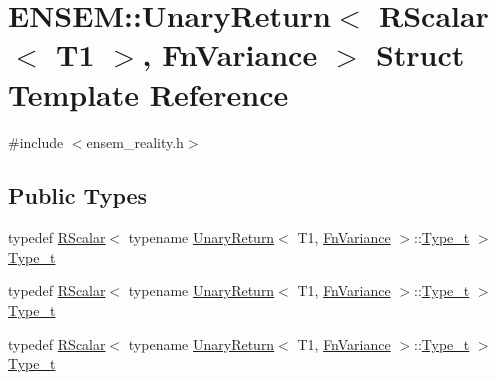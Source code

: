 \hypertarget{structENSEM_1_1UnaryReturn_3_01RScalar_3_01T1_01_4_00_01FnVariance_01_4}{}\section{E\+N\+S\+EM\+:\+:Unary\+Return$<$ R\+Scalar$<$ T1 $>$, Fn\+Variance $>$ Struct Template Reference}
\label{structENSEM_1_1UnaryReturn_3_01RScalar_3_01T1_01_4_00_01FnVariance_01_4}


{\ttfamily \#include $<$ensem\+\_\+reality.\+h$>$}

\subsection*{Public Types}
\begin{DoxyCompactItemize}
\item 
typedef \mbox{\hyperlink{classENSEM_1_1RScalar}{R\+Scalar}}$<$ typename \mbox{\hyperlink{structENSEM_1_1UnaryReturn}{Unary\+Return}}$<$ T1, \mbox{\hyperlink{structENSEM_1_1FnVariance}{Fn\+Variance}} $>$\+::\mbox{\hyperlink{structENSEM_1_1UnaryReturn_3_01RScalar_3_01T1_01_4_00_01FnVariance_01_4_aadaa55c2cab1c15c97829d8d0a69b228}{Type\+\_\+t}} $>$ \mbox{\hyperlink{structENSEM_1_1UnaryReturn_3_01RScalar_3_01T1_01_4_00_01FnVariance_01_4_aadaa55c2cab1c15c97829d8d0a69b228}{Type\+\_\+t}}
\item 
typedef \mbox{\hyperlink{classENSEM_1_1RScalar}{R\+Scalar}}$<$ typename \mbox{\hyperlink{structENSEM_1_1UnaryReturn}{Unary\+Return}}$<$ T1, \mbox{\hyperlink{structENSEM_1_1FnVariance}{Fn\+Variance}} $>$\+::\mbox{\hyperlink{structENSEM_1_1UnaryReturn_3_01RScalar_3_01T1_01_4_00_01FnVariance_01_4_aadaa55c2cab1c15c97829d8d0a69b228}{Type\+\_\+t}} $>$ \mbox{\hyperlink{structENSEM_1_1UnaryReturn_3_01RScalar_3_01T1_01_4_00_01FnVariance_01_4_aadaa55c2cab1c15c97829d8d0a69b228}{Type\+\_\+t}}
\item 
typedef \mbox{\hyperlink{classENSEM_1_1RScalar}{R\+Scalar}}$<$ typename \mbox{\hyperlink{structENSEM_1_1UnaryReturn}{Unary\+Return}}$<$ T1, \mbox{\hyperlink{structENSEM_1_1FnVariance}{Fn\+Variance}} $>$\+::\mbox{\hyperlink{structENSEM_1_1UnaryReturn_3_01RScalar_3_01T1_01_4_00_01FnVariance_01_4_aadaa55c2cab1c15c97829d8d0a69b228}{Type\+\_\+t}} $>$ \mbox{\hyperlink{structENSEM_1_1UnaryReturn_3_01RScalar_3_01T1_01_4_00_01FnVariance_01_4_aadaa55c2cab1c15c97829d8d0a69b228}{Type\+\_\+t}}
\end{DoxyCompactItemize}


